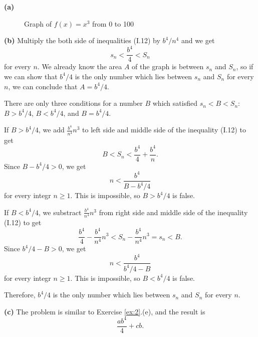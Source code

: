 \begin{solution}
  \textbf{(a)}
    \begin{figure}[H]
      \centering
      \caption*{Graph of $f(x)=x^3$ from 0 to 100}
    \end{figure}

  \vspace{2\baselineskip}
  \textbf{(b)}
  Multiply the both side of inequalities (I.12) by $b^4/n^4$ and we get
  \[
  s_n < \frac{b^4}{4} < S_n
  \]
  for every $n$. We already know the area $A$ of the graph is between $s_n$ and $S_n$, so if we can
  show that $b^4/4$ is the only number which lies between $s_n$ and $S_n$ for every $n$, we can conclude that $A = b^4/4$.

  There are only three conditions for a number $B$ which satisfied $s_n < B < S_n$: $B > b^4/4$, $B < b^4/4$, and $B = b^4/4$.

  If $B > b^4/4$, we add $\frac{b^4}{n^4}n^3$ to left side and middle side of the inequality (I.12) to get
  \[
  B < S_n < \frac{b^4}{4} + \frac{b^4}{n}.
  \]
  Since $B - b^4/4 > 0$, we get
  \[
  n < \frac{b^4}{B - b^4/4}
  \]
  for every integr $n \ge 1$. This is impossible, so $B > b^4/4$ is false.

  If $B < b^4/4$, we substract $\frac{b^4}{n^4}n^3$ from right side and middle side of the inequality (I.12) to get
  \[
  \frac{b^4}{4} - \frac{b^4}{n^4}n^3 < S_n - \frac{b^4}{n^4}n^3 = s_n < B.
  \]
  Since $b^4/4 - B > 0$, we get
  \[
  n < \frac{b^4}{b^4/4 - B}
  \]
  for every integr $n \ge 1$. This is impossible, so $B < b^4/4$ is false.

  Therefore, $b^4/4$ is the only number which lies between $s_n$ and $S_n$ for every $n$.

  \vspace{2\baselineskip}
  \textbf{(c)}
  The problem is similar to Exercise \ref{ex:2}.(e), and the result is
  \[
  \frac{ab^4}{4} + cb.
  \]
\end{solution}

